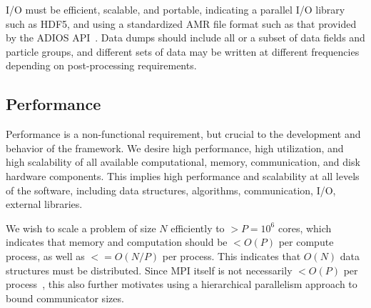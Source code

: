 \documentclass{article}
\begin{document}
I/O must be efficient, scalable, and portable, indicating a parallel
I/O library such as HDF5, and using a standardized AMR file format
such as that provided by the ADIOS API~\cite{LoKl08}.  Data dumps
should include all or a subset of data fields and particle groups, and
different sets of data may be written at different frequencies
depending on post-processing requirements.

       
\subsection{Performance}

Performance is a non-functional requirement, but crucial to the
development and behavior of the framework.  We desire high
performance, high utilization, and high scalability of all available
computational, memory, communication, and disk hardware components.
This implies high performance and scalability at all levels of the
software, including data structures, algorithms, communication, I/O,
external libraries.

We wish to scale a problem of size $N$ efficiently to $> P = 10^6$
cores, which indicates that memory and computation should be $< O(P)$
per compute process, as well as $<= O(N/P)$ per process.  This
indicates that $O(N)$ data structures must be distributed.  Since MPI
itself is not necessarily $< O(P)$ per process~\cite{BaBu09}, this also
further motivates using a hierarchical parallelism approach to bound
communicator sizes.
\end{document}
